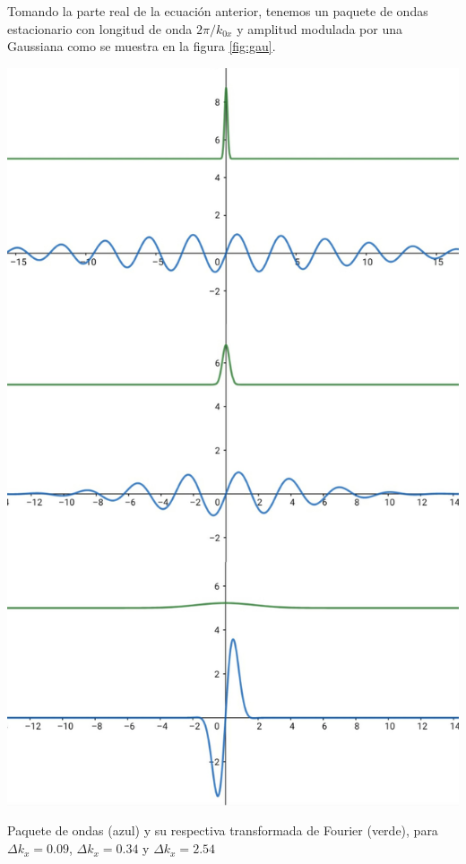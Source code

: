 Tomando la parte real de la ecuación anterior, tenemos un paquete de ondas estacionario con longitud de onda $2\pi/k_{0x}$ y amplitud modulada por una Gaussiana como se muestra en la figura \ref{fig:gau}. 
\begin{marginfigure}
\captionsetup{type=figure}
    \centering
    \includegraphics[width=1.3\textwidth]{Im/gausss.jpg}
    \caption{Paquete de ondas (azul) y su respectiva transformada de Fourier (verde), para $\Delta k_x=0.09$, $\Delta k_x=0.34$ y $\Delta k_x=2.54$}
    \label{fig:gau}
\end{marginfigure}
\vspace{0.5cm}


